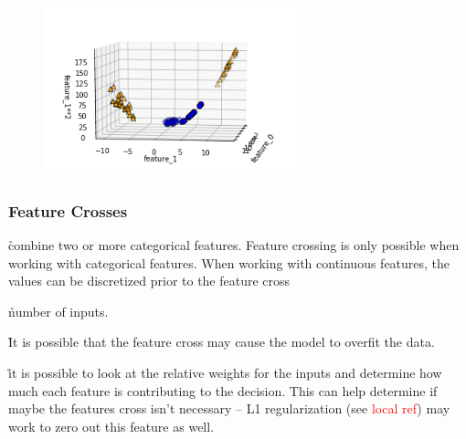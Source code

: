 \begin{figure}
\centering
\includegraphics[width=0.65\textwidth]{./sync_imgs/kernelized/2class4clust/3dimg.png}
\label{fig:kernelized_2class4clust_3dimg}
\end{figure}


\subsubsection{Feature Crosses}


\r{combine two or more categorical features. Feature crossing is only possible when working with categorical features. When working with continuous features, the values can be discretized prior to the feature cross}



\r{number of inputs.}

\r{It is possible that the feature cross may cause the model to overfit the data.}


\r{it is possible to look at the relative weights for the inputs and determine how much each feature is contributing to the decision. This can help determine if maybe the features cross isn't necessary -- L1 regularization (see \textcolor{red}{local ref}) may work to zero out this feature as well.}

